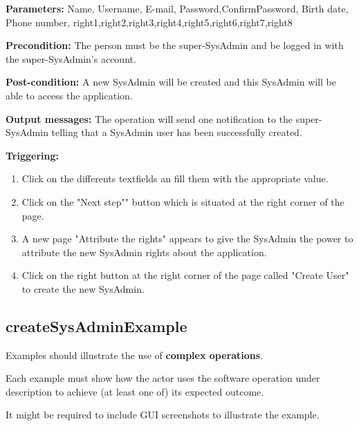 \begin{description}

\item \textbf{Parameters:} Name, Username, E-mail, Password,ConfirmPassword,
Birth date, Phone number, right1,right2,right3,right4,right5,right6,right7,right8
\item \textbf{Precondition:} The person must be the super-SysAdmin and be logged
in with the super-SysAdmin's account.
\item \textbf{Post-condition:} A new SysAdmin will be created and this SysAdmin
will be able to access the application.
\item \textbf{Output messages:} The operation will send one notification to the super-SysAdmin telling that a SysAdmin
user has been successfully created.
\item \textbf{Triggering:} 
\begin{enumerate}
\item Click on the differents textfields an fill them with the appropriate value.
\item Click on the "Next step"" button which is
situated at the right corner of the page.
\item A new page "Attribute the rights" appears to give the SysAdmin the power
to attribute the new SysAdmin rights about the application.
\item Click on the right button at the right corner of the page called "Create
User" to create the new SysAdmin.
\end{enumerate}

 
\end{description}

\subsection{createSysAdminExample}
Examples should illustrate the use of \textbf{complex operations}.

Each example must show how the actor uses the software operation under
description to achieve (at least one of) its expected outcome.

It might be required to include GUI screenshots to illustrate the example.
















